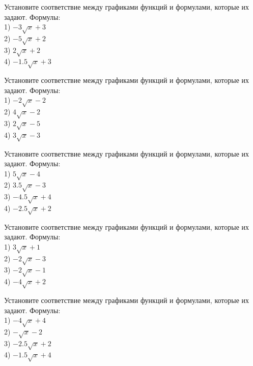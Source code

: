 \documentclass[4apaper]{article}
\begin{document}
\begin{taskBN}{46}
Установите соответствие между графиками функций и формулами, которые их задают. Формулы: \\1) $-3\sqrt{x}+3$\\2) $-5\sqrt{x}+2$\\3) $2\sqrt{x}+2$\\4) $-1.5\sqrt{x}+3$
\end{taskBN}

\begin{taskBN}{47}
Установите соответствие между графиками функций и формулами, которые их задают. Формулы: \\1) $-2\sqrt{x}-2$\\2) $4\sqrt{x}-2$\\3) $2\sqrt{x}-5$\\4) $3\sqrt{x}-3$
\end{taskBN}

\begin{taskBN}{48}
Установите соответствие между графиками функций и формулами, которые их задают. Формулы: \\1) $5\sqrt{x}-4$\\2) $3.5\sqrt{x}-3$\\3) $-4.5\sqrt{x}+4$\\4) $-2.5\sqrt{x}+2$
\end{taskBN}

\begin{taskBN}{49}
Установите соответствие между графиками функций и формулами, которые их задают. Формулы: \\1) $3\sqrt{x}+1$\\2) $-2\sqrt{x}-3$\\3) $-2\sqrt{x}-1$\\4) $-4\sqrt{x}+2$
\end{taskBN}

\begin{taskBN}{50}
Установите соответствие между графиками функций и формулами, которые их задают. Формулы: \\1) $-4\sqrt{x}+4$\\2) $-\sqrt{x}-2$\\3) $-2.5\sqrt{x}+2$\\4) $-1.5\sqrt{x}+4$
\end{taskBN}
\end{document}
